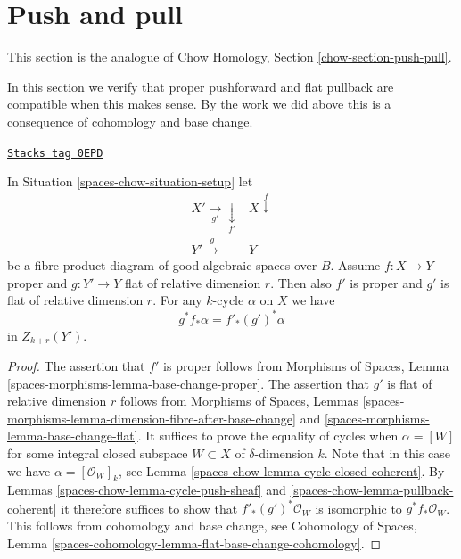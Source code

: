 \section{Push and pull}
\label{spaces-chow-section-push-pull}
This section is the analogue of
Chow Homology, Section \ref{chow-section-push-pull}.

\medskip\noindent
In this section we verify that proper pushforward and flat pullback
are compatible when this makes sense. By the work we did above this
is a consequence of cohomology and base change.

\begin{lemma}
\label{spaces-chow-lemma-flat-pullback-proper-pushforward}
\href{https://stacks.math.columbia.edu/tag/0EPD}{\texttt{Stacks tag 0EPD}}

In Situation \ref{spaces-chow-situation-setup} let
$$
\begin{array}{cc}X' \underset{g'}{\longrightarrow}\underset{f'}{\downarrow} & X \overset{f}{\downarrow} \\ Y' \overset{g}{\longrightarrow} & Y\end{array}
$$
be a fibre product diagram of good algebraic spaces over $B$.
Assume $f : X \to Y$ proper and $g : Y' \to Y$ flat of relative dimension $r$.
Then also $f'$ is proper and $g'$ is flat of relative dimension $r$.
For any $k$-cycle $\alpha$ on $X$ we have
$$
g^*f_*\alpha = f'_*(g')^*\alpha
$$
in $Z_{k + r}(Y')$.
\end{lemma}

\begin{proof}
The assertion that $f'$ is proper follows from
Morphisms of Spaces, Lemma \ref{spaces-morphisms-lemma-base-change-proper}.
The assertion that $g'$ is flat of relative dimension $r$ follows from
Morphisms of Spaces, Lemmas
\ref{spaces-morphisms-lemma-dimension-fibre-after-base-change}
and \ref{spaces-morphisms-lemma-base-change-flat}.
It suffices to prove the equality of cycles when $\alpha = [W]$
for some integral closed subspace $W \subset X$ of $\delta$-dimension $k$.
Note that in this case we have $\alpha = [\mathcal{O}_W]_k$, see
Lemma \ref{spaces-chow-lemma-cycle-closed-coherent}.
By Lemmas \ref{spaces-chow-lemma-cycle-push-sheaf} and
\ref{spaces-chow-lemma-pullback-coherent} it therefore suffices
to show that $f'_*(g')^*\mathcal{O}_W$ is isomorphic to
$g^*f_*\mathcal{O}_W$. This follows from cohomology and
base change, see Cohomology of Spaces, Lemma
\ref{spaces-cohomology-lemma-flat-base-change-cohomology}.
\end{proof}

